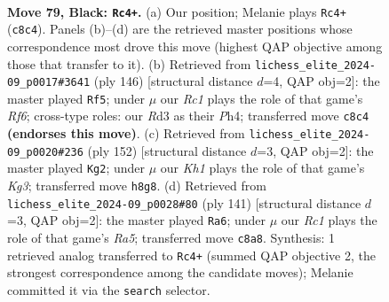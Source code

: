 \documentclass[11pt]{article}
\begin{document}
\clearpage

\begin{figure}[p]\centering
\begin{subfigure}{0.46\textwidth}\centering
\resizebox{\linewidth}{!}{%
\newchessgame
\chessboard[
  setfen={2r4k/1R6/8/8/5K1P/3r4/8/8 b - - 0 79},
  showmover=false,
  pgfstyle=straightmove, color=movearrow, markmove={c8-c4}
]}
\caption{}
\end{subfigure}\hfill
\begin{subfigure}{0.46\textwidth}\centering
\resizebox{\linewidth}{!}{%
\newchessgame
\chessboard[
  setfen={8/8/5R1K/8/7P/4k3/6r1/8 w - - 23 74},
  showmover=false,
  pgfstyle=straightmove, color=movearrow, markmove={f6-f5}
]}
\caption{}
\end{subfigure}
\\[4pt]
\begin{subfigure}{0.46\textwidth}\centering
\resizebox{\linewidth}{!}{%
\newchessgame
\chessboard[
  setfen={8/5r2/6R1/8/R7/4k1K1/8/8 w - - 5 77},
  showmover=false,
  pgfstyle=straightmove, color=movearrow, markmove={g3-g2}
]}
\caption{}
\end{subfigure}\hfill
\begin{subfigure}{0.46\textwidth}\centering
\resizebox{\linewidth}{!}{%
\newchessgame
\chessboard[
  setfen={8/8/8/7P/r4k2/3K4/8/6R1 b - - 0 71},
  showmover=false,
  pgfstyle=straightmove, color=movearrow, markmove={a4-a6}
]}
\caption{}
\end{subfigure}
\caption{\textbf{Move 79, Black: \texttt{Rc4+}.} (a) Our position; Melanie plays \texttt{Rc4+} (\texttt{c8c4}). Panels (b)--(d) are the retrieved master positions whose correspondence most drove this move (highest QAP objective among those that transfer to it). (b) Retrieved from \texttt{lichess\_elite\_2024-09\_p0017\#3641} (ply 146) [structural distance $d$=4, QAP obj=2]: the master played \texttt{Rf5}; under $\mu$ our \emph{Rc1} plays the role of that game's \emph{Rf6}; cross-type roles: our \emph{R}d3 as their \emph{P}h4; transferred move \texttt{c8c4} \textbf{(endorses this move)}. (c) Retrieved from \texttt{lichess\_elite\_2024-09\_p0020\#236} (ply 152) [structural distance $d$=3, QAP obj=2]: the master played \texttt{Kg2}; under $\mu$ our \emph{Kh1} plays the role of that game's \emph{Kg3}; transferred move \texttt{h8g8}. (d) Retrieved from \texttt{lichess\_elite\_2024-09\_p0028\#80} (ply 141) [structural distance $d$=3, QAP obj=2]: the master played \texttt{Ra6}; under $\mu$ our \emph{Rc1} plays the role of that game's \emph{Ra5}; transferred move \texttt{c8a8}. Synthesis: 1 retrieved analog transferred to \texttt{Rc4+} (summed QAP objective 2, the strongest correspondence among the candidate moves); Melanie committed it via the \texttt{search} selector.}
\label{fig:thought-m157}
\end{figure}
\end{document}
